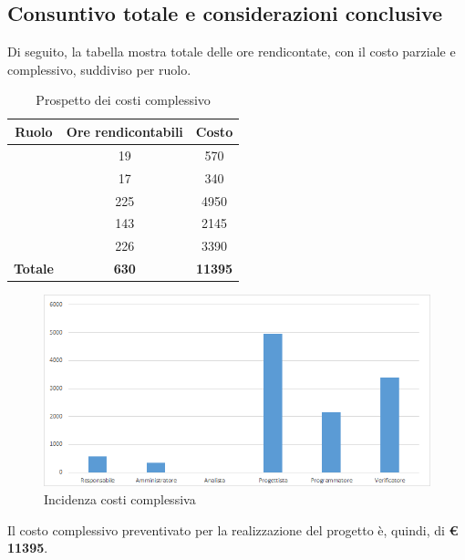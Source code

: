 \subsection{Consuntivo totale e considerazioni conclusive}

Di seguito, la tabella mostra totale delle ore rendicontate, con il costo parziale e complessivo, suddiviso per ruolo. 

\begin{table}[H]
	\begin{center}
		\begin{tabular}{|c|c|c|}
			\hline
			\textbf{Ruolo}	& \textbf{Ore rendicontabili} & \textbf{Costo} \\
			\hline
			\Res	&	19  &	570	\\
			\hline
			\Amm	&	17  &	340	\\
			\hline
			\Prog	&	225  &	4950	\\
			\hline
			\Progr	&	143  &	2145	\\
			\hline
			\Ver	&	226  &	3390	\\
			\hline
			\textbf{Totale}  & \textbf{630}  &	\textbf{11395}	\\
			\hline
		\end{tabular}
	\end{center}
	\caption{Prospetto dei costi complessivo}
\end{table}

\begin{figure}[H]
	\centering
	\includegraphics[scale=0.6]{img/8-6.png}
	\caption{Incidenza costi complessiva}
\end{figure}

Il costo complessivo preventivato per la realizzazione del progetto è, quindi, di \textbf{€ 11395}.